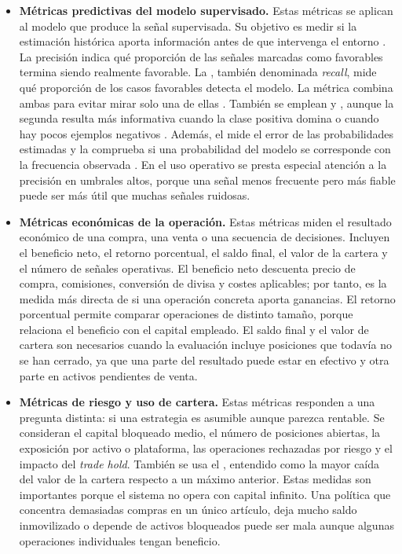 \begin{itemize}
  \item \textbf{Métricas predictivas del modelo supervisado.} Estas métricas se aplican al modelo que produce la señal supervisada. Su objetivo es medir si la estimación histórica aporta información antes de que intervenga el entorno . La precisión indica qué proporción de las señales marcadas como favorables termina siendo realmente favorable. La \textbf{}, también denominada \emph{recall}, mide qué proporción de los casos favorables detecta el modelo. La métrica  combina ambas para evitar mirar solo una de ellas \cite{powers2011evaluation}. También se emplean  y , aunque la segunda resulta más informativa cuando la clase positiva domina o cuando hay pocos ejemplos negativos \cite{saito2015pr}. Además, el \textbf{} mide el error de las probabilidades estimadas y la \textbf{} comprueba si una probabilidad del modelo se corresponde con la frecuencia observada \cite{niculescu2005predicting,guo2017calibration}. En el uso operativo se presta especial atención a la precisión en umbrales altos, porque una señal menos frecuente pero más fiable puede ser más útil que muchas señales ruidosas.

  \item \textbf{Métricas económicas de la operación.} Estas métricas miden el resultado económico de una compra, una venta o una secuencia de decisiones. Incluyen el beneficio neto, el retorno porcentual, el saldo final, el valor de la cartera y el número de señales operativas. El beneficio neto descuenta precio de compra, comisiones, conversión de divisa y costes aplicables; por tanto, es la medida más directa de si una operación concreta aporta ganancias. El retorno porcentual permite comparar operaciones de distinto tamaño, porque relaciona el beneficio con el capital empleado. El saldo final y el valor de cartera son necesarios cuando la evaluación incluye posiciones que todavía no se han cerrado, ya que una parte del resultado puede estar en efectivo y otra parte en activos pendientes de venta.

  \item \textbf{Métricas de riesgo y uso de cartera.} Estas métricas responden a una pregunta distinta: si una estrategia es asumible aunque parezca rentable. Se consideran el capital bloqueado medio, el número de posiciones abiertas, la exposición por activo o plataforma, las operaciones rechazadas por riesgo y el impacto del \textit{trade hold}. También se usa el \textbf{}, entendido como la mayor caída del valor de la cartera respecto a un máximo anterior. Estas medidas son importantes porque el sistema no opera con capital infinito. Una política que concentra demasiadas compras en un único artículo, deja mucho saldo inmovilizado o depende de activos bloqueados puede ser mala aunque algunas operaciones individuales tengan beneficio.


\end{itemize}
